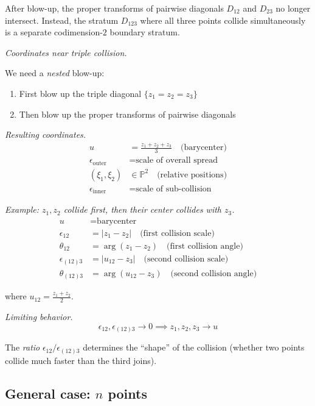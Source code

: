 \begin{example}
After blow-up, the proper transforms of pairwise diagonals $D_{12}$ and $D_{23}$ no longer intersect.  Instead, the stratum $D_{123}$ where all three points collide simultaneously is a separate codimension-$2$ boundary stratum.

\emph{Coordinates near triple collision.}

We need a \emph{nested} blow-up:
\begin{enumerate}
\item First blow up the triple diagonal $\{z_1 = z_2 = z_3\}$
\item Then blow up the proper transforms of pairwise diagonals
\end{enumerate}

\emph{Resulting coordinates.}
\begin{align}
u &= \frac{z_1 + z_2 + z_3}{3} \quad \text{(barycenter)}\\
\epsilon_{\text{outer}} &= \text{scale of overall spread}\\
(\xi_1, \xi_2) &\in \mathbb{P}^2 \quad \text{(relative positions)}\\
\epsilon_{\text{inner}} &= \text{scale of sub-collision}
\end{align}

\emph{Example: $z_1, z_2$ collide first, then their center collides with $z_3$.}
\begin{align}
u &= \text{barycenter}\\
\epsilon_{12} &= |z_1 - z_2| \quad \text{(first collision scale)}\\
\theta_{12} &= \arg(z_1 - z_2) \quad \text{(first collision angle)}\\
\epsilon_{(12)3} &= |u_{12} - z_3| \quad \text{(second collision scale)}\\
\theta_{(12)3} &= \arg(u_{12} - z_3) \quad \text{(second collision angle)}
\end{align}

where $u_{12} = \frac{z_1 + z_2}{2}$.

\emph{Limiting behavior.}
\[\epsilon_{12}, \epsilon_{(12)3} \to 0 \implies z_1, z_2, z_3 \to u\]

The \emph{ratio} $\epsilon_{12} / \epsilon_{(12)3}$ determines the ``shape'' of the
collision (whether two points collide much faster than the third joins).
\end{example}

\subsection{\texorpdfstring{General case: $n$ points}{General case: n points}}


